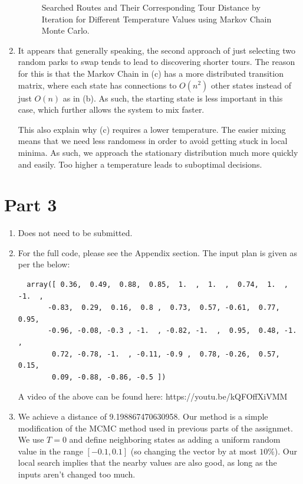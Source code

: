 \documentclass[12pt]{article}
\begin{document}
\begin{enumerate}[label=(\alph*)]
\begin{figure}[!ht]
      \caption{Searched Routes and Their Corresponding Tour Distance by Iteration for Different Temperature Values using Markov Chain Monte Carlo.}
      \label{fig:iteration_mcmc_2}
    \end{figure}

  \item It appears that generally speaking, the second approach of just selecting two random parks to swap tends to lead to discovering shorter tours. The reason for this is that the Markov Chain in (c) has a more distributed transition matrix, where each state has connections to $O(n^2)$ other states instead of just $O(n)$ as in (b). As such, the starting state is less important in this case, which further allows the system to mix faster. 

  This also explain why (c) requires a lower temperature. The easier mixing means that we need less randomess in order to avoid getting stuck in local minima. As such, we approach the stationary distribution much more quickly and easily. Too higher a temperature leads to suboptimal decisions.

\end{enumerate}

\newpage
\section*{Part 3}
\begin{enumerate}[label=(\alph*)]
  \item Does not need to be submitted.
  \item For the full code, please see the Appendix section. The input plan is given as per the below:
  \begin{verbatim}
  array([ 0.36,  0.49,  0.88,  0.85,  1.  ,  1.  ,  0.74,  1.  , -1.  ,
       -0.83,  0.29,  0.16,  0.8 ,  0.73,  0.57, -0.61,  0.77,  0.95,
       -0.96, -0.08, -0.3 , -1.  , -0.82, -1.  ,  0.95,  0.48, -1.  ,
        0.72, -0.78, -1.  , -0.11, -0.9 ,  0.78, -0.26,  0.57,  0.15,
        0.09, -0.88, -0.86, -0.5 ])
  \end{verbatim}

  A video of the above can be found here: https://youtu.be/kQFOffXiVMM
  \item We achieve a distance of 9.198867470630958. Our method is a simple modification of the MCMC method used in previous parts of the assignmet. We use $T = 0$ and define neighboring states as adding a uniform random value in the range $[-0.1, 0.1]$ (so changing the vector by at most $10\%$). Our local search implies that the nearby values are also good, as long as the inputs aren't changed too much. 

\end{enumerate}


\newpage

\end{document}
